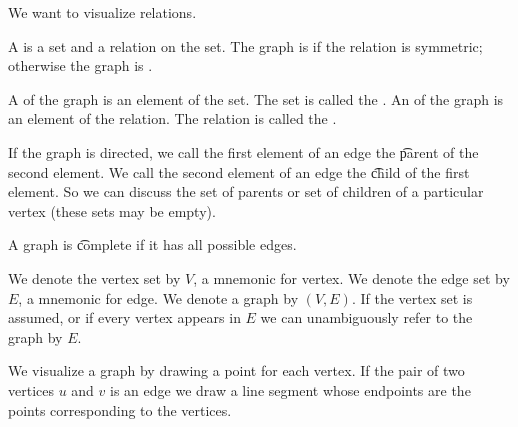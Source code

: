 
\sbasic









\sstart
{}


We want to visualize relations.


A  is a set and a relation on the set.
The graph is  if the relation is symmetric; otherwise the graph is .

A  of the graph is an element of the set.
The set is called the .  An  of the graph is an element of the relation.
The relation is called the .

If the graph is directed, we call the first element of an edge the \t{parent} of the second element. We call the second element of an edge the \t{child} of the first element. So we can discuss the set of parents or set of children of a particular vertex (these sets may be empty).

A graph is \t{complete} if it has all possible edges.



We denote the vertex set by $V$, a mnemonic for
vertex.
We denote the edge set by $E$, a mnemonic for
edge.
We denote a graph by $(V, E)$.
If the vertex set is assumed, or if every vertex appears in $E$  we can unambiguously refer to the graph by $E$.



We visualize a graph by drawing a point for each vertex.
If the pair of two vertices $u$ and $v$ is an edge we draw a line segment whose endpoints are the points corresponding to the vertices.

